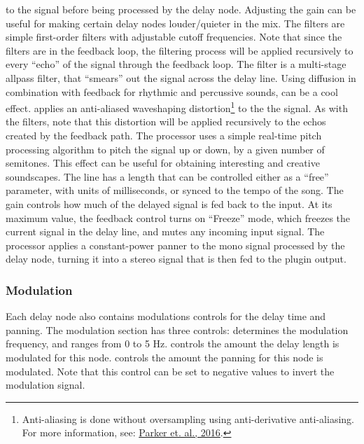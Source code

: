\documentclass[landscape,twocolumn,a5paper]{manual}
\begin{document}
to the signal before being processed by the delay
node. Adjusting the gain can be useful for making
certain delay nodes louder/quieter in the mix.
\newpar
The  filters are simple
first-order filters with adjustable cutoff frequencies.
Note that since the filters are in the feedback loop,
the filtering process will be applied recursively to every
``echo'' of the signal through the feedback loop.
\newpar
The  filter is a multi-stage allpass
filter, that ``smears'' out the signal across the delay line.
Using diffusion in combination with feedback for rhythmic
and percussive sounds, can be a cool effect.
\newpar
{} applies an anti-aliased waveshaping
distortion\footnote{Anti-aliasing is done without oversampling using anti-derivative anti-aliasing. For more information, see: \href{http://dafx16.vutbr.cz/dafxpapers/20-DAFx-16_paper_41-PN.pdf}{Parker et. al., 2016}.}
to the the signal. As with the filters, note that this
distortion will be applied recursively to the echos created
by the feedback path.
\newpar
The  processor uses a simple real-time
pitch processing algorithm to pitch the signal up or down,
by a given number of semitones. This effect can be useful for
obtaining interesting and creative soundscapes.
\newpar
The  line has a length that can be
controlled either as a ``free'' parameter, with units
of milliseconds, or synced to the tempo of the song.
\newpar
The  gain controls how much of the
delayed signal is fed back to the input. At its maximum
value, the feedback control turns on ``Freeze'' mode, which
freezes the current signal in the delay line, and mutes
any incoming input signal.
\newpar
The  processor applies a constant-power
panner to the mono signal processed by the delay node,
turning it into a stereo signal that is then fed to the
plugin output.

\subsubsection{Modulation}
Each delay node also contains modulations controls for the
delay time and panning. The modulation section has three
controls:
\newpar
{} determines the modulation frequency,
and ranges from 0 to 5 Hz.
 controls the amount the delay length
is modulated for this node.
 controls the amount the panning for
this node is modulated. Note that this control can be
set to negative values to invert the modulation signal.
\end{document}
